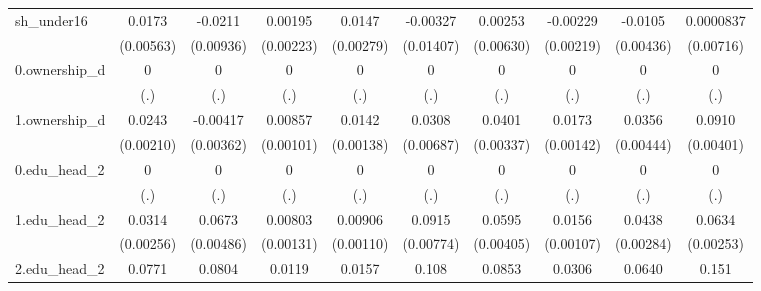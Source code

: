 \begin{table}[htbp]
\begin{tabular}{l*{9}{c}}
sh\_under16  &      0.0173\sym{***}&     -0.0211\sym{**} &     0.00195         &      0.0147\sym{***}&    -0.00327         &     0.00253         &    -0.00229         &     -0.0105\sym{**} &   0.0000837         \\
            &   (0.00563)         &   (0.00936)         &   (0.00223)         &   (0.00279)         &   (0.01407)         &   (0.00630)         &   (0.00219)         &   (0.00436)         &   (0.00716)         \\
0.ownership\_d&           0         &           0         &           0         &           0         &           0         &           0         &           0         &           0         &           0         \\
            &         (.)         &         (.)         &         (.)         &         (.)         &         (.)         &         (.)         &         (.)         &         (.)         &         (.)         \\
1.ownership\_d&      0.0243\sym{***}&    -0.00417         &     0.00857\sym{***}&      0.0142\sym{***}&      0.0308\sym{***}&      0.0401\sym{***}&      0.0173\sym{***}&      0.0356\sym{***}&      0.0910\sym{***}\\
            &   (0.00210)         &   (0.00362)         &   (0.00101)         &   (0.00138)         &   (0.00687)         &   (0.00337)         &   (0.00142)         &   (0.00444)         &   (0.00401)         \\
0.edu\_head\_2&           0         &           0         &           0         &           0         &           0         &           0         &           0         &           0         &           0         \\
            &         (.)         &         (.)         &         (.)         &         (.)         &         (.)         &         (.)         &         (.)         &         (.)         &         (.)         \\
1.edu\_head\_2&      0.0314\sym{***}&      0.0673\sym{***}&     0.00803\sym{***}&     0.00906\sym{***}&      0.0915\sym{***}&      0.0595\sym{***}&      0.0156\sym{***}&      0.0438\sym{***}&      0.0634\sym{***}\\
            &   (0.00256)         &   (0.00486)         &   (0.00131)         &   (0.00110)         &   (0.00774)         &   (0.00405)         &   (0.00107)         &   (0.00284)         &   (0.00253)         \\
2.edu\_head\_2&      0.0771\sym{***}&      0.0804\sym{***}&      0.0119\sym{***}&      0.0157\sym{***}&       0.108\sym{***}&      0.0853\sym{***}&      0.0306\sym{***}&      0.0640\sym{***}&       0.151\sym{***}\\

\end{tabular}
\end{table}
